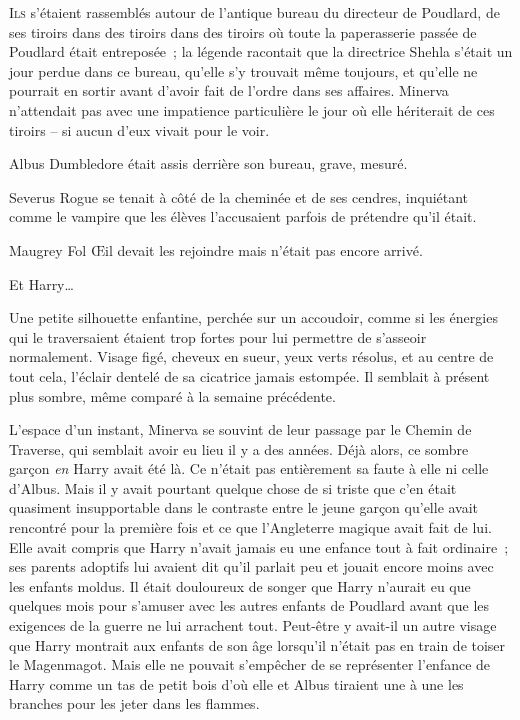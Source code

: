 \lettrine{I}{ls} s'étaient rassemblés autour de l'antique bureau du directeur de Poudlard, de ses tiroirs dans des tiroirs dans des tiroirs où toute la paperasserie passée de Poudlard était entreposée~; la légende racontait que la directrice Shehla s'était un jour perdue dans ce bureau, qu'elle s'y trouvait même toujours, et qu'elle ne pourrait en sortir avant d'avoir fait de l'ordre dans ses affaires.
Minerva n'attendait pas avec une impatience particulière le jour où elle hériterait de ces tiroirs -- si aucun d'eux vivait pour le voir.

Albus Dumbledore était assis derrière son bureau, grave, mesuré.

Severus Rogue se tenait à côté de la cheminée et de ses cendres, inquiétant comme le vampire que les élèves l'accusaient parfois de prétendre qu'il était.

Maugrey Fol Œil devait les rejoindre mais n'était pas encore arrivé.

Et Harry…

Une petite silhouette enfantine, perchée sur un accoudoir, comme si les énergies qui le traversaient étaient trop fortes pour lui permettre de s'asseoir normalement.
Visage figé, cheveux en sueur, yeux verts résolus, et au centre de tout cela, l'éclair dentelé de sa cicatrice jamais estompée.
Il semblait à présent plus sombre, même comparé à la semaine précédente.

L'espace d'un instant, Minerva se souvint de leur passage par le Chemin de Traverse, qui semblait avoir eu lieu il y a des années.
Déjà alors, ce sombre garçon \emph{en} Harry avait été là.
Ce n'était pas entièrement sa faute à elle ni celle d'Albus.
Mais il y avait pourtant quelque chose de si triste que c'en était quasiment insupportable dans le contraste entre le jeune garçon qu'elle avait rencontré pour la première fois et ce que l'Angleterre magique avait fait de lui.
Elle avait compris que Harry n'avait jamais eu une enfance tout à fait ordinaire~; ses parents adoptifs lui avaient dit qu'il parlait peu et jouait encore moins avec les enfants moldus.
Il était douloureux de songer que Harry n'aurait eu que quelques mois pour s'amuser avec les autres enfants de Poudlard avant que les exigences de la guerre ne lui arrachent tout.
Peut-être y avait-il un autre visage que Harry montrait aux enfants de son âge lorsqu'il n'était pas en train de toiser le Magenmagot.
Mais elle ne pouvait s'empêcher de se représenter l'enfance de Harry comme un tas de petit bois d'où elle et Albus tiraient une à une les branches pour les jeter dans les flammes.

